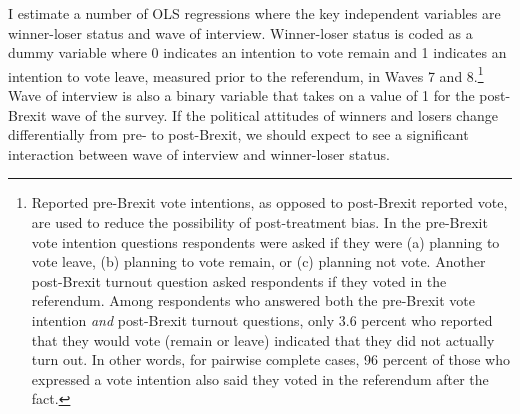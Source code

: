 \documentclass[12pt, letter]{article}
\begin{document}
I estimate a number of OLS regressions where the key independent variables are winner-loser status and wave of interview. Winner-loser status is coded as a dummy variable where 0 indicates an intention to vote remain and 1 indicates an intention to vote leave, measured prior to the referendum, in Waves 7 and 8.\footnote{Reported pre-Brexit vote intentions, as opposed to post-Brexit reported vote, are used to reduce the possibility of post-treatment bias. In the pre-Brexit vote intention questions respondents were asked if they were (a) planning to vote leave, (b) planning to vote remain, or (c) planning not vote. Another post-Brexit turnout question asked respondents if they voted in the referendum. Among respondents who answered both the pre-Brexit vote intention \textit{and} post-Brexit turnout questions, only 3.6 percent who reported that they would vote (remain or leave) indicated that they did not actually turn out. In other words, for pairwise complete cases, 96 percent of those who expressed a vote intention also said they voted in the referendum after the fact.} Wave of interview is also a binary variable that takes on a value of 1 for the post-Brexit wave of the survey. If the political attitudes of winners and losers change differentially from pre- to post-Brexit, we should expect to see a significant interaction between wave of interview and winner-loser status. 
\end{document}
